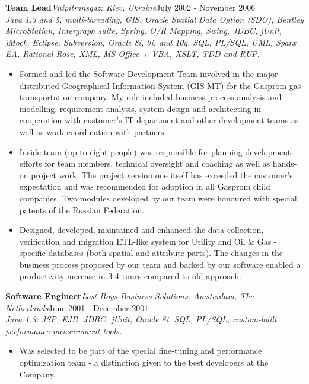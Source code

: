 \documentclass{res}
\newcommand{\jobdes}[4]{\needspace{3\baselineskip} %
{\noindent \bf #3\hspace{2ex}}{{\em \small #1}}{\hfill #2}\\{{\it \small #4.}}}
\newif\ifFullVersion
\begin{document}
\begin{resume}
\jobdes{Vnipitransgaz: Kiev, Ukraine}{July 2002 - November 2006}{Team Lead}
{Java 1.3 and 5, multi-threading, GIS, Oracle Spatial Data Option (SDO), Bentley MicroStation, Intergraph suite, Spring, O/R Mapping, Swing, JDBC, jUnit, jMock, Eclipse, Subversion, Oracle 8i, 9i, and 10g, SQL, PL/SQL, UML, Sparx EA, Rational Rose, XML, MS Office + VBA, XSLT, TDD and RUP}
\begin{itemize} \itemsep -2pt %
 \item Formed and led the Software Development Team involved in the major distributed Geographical Information System (GIS MT) for the Gasprom gas transportation company. My role included business process analysis and modelling, requirement analysis, system design and architecting in cooperation with customer’s IT department and other development teams as well as work coordination with partners.
 \item Inside team (up to eight people) was responsible for planning development efforts for team members, technical oversight and coaching as well as hands-on project work. The project version one itself has exceeded the customer’s expectation and was recommended for adoption in all Gasprom child companies. Two modules developed by our team were honoured with special patents of the Russian Federation.
 \ifFullVersion
 \item Wrote, maintained, and enhanced the numerous smaller projects for Energy, Utility and Oil\&Gas - oriented customers in the Data Capture, Data Verification and ETL areas.
\else
   \item Designed, developed, maintained and enhanced the data collection, verification and migration ETL-like system for Utility and Oil \& Gas - specific databases (both spatial and attribute parts). The changes in the business process proposed by our team and backed by our software enabled a productivity increase in 3-4 times compared to old approach.
\fi
\end{itemize}
\jobdes {Lost Boys Business Solutions: Amsterdam, The Netherlands}{June 2001 - December 2001}{Software Engineer}
{Java 1.3: JSP, EJB, JDBC, jUnit, Oracle 8i, SQL, PL/SQL, custom-built performance measurement tools}
\begin{itemize} \itemsep -2pt %
 \item Was selected to be part of the special fine-tuning and performance optimization team - a distinction given to the best developers at the Company.
\end{itemize}

\end{resume}
\end{document}
